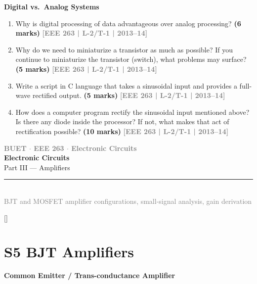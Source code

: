\documentclass[12pt,a4paper]{article}
\newcommand{\yr}[1]{\hfill\textcolor{gray}{\small\textbf{[#1]}}}
\newcommand{\mk}[1]{\textcolor{orange!70!black}{\small\textbf{(#1 marks)}}}
\newcommand{\subtopic}[2]{%
  \vspace{10pt}
  \noindent\begin{tcolorbox}[colback=#1!8,colframe=#1,boxrule=0.6pt,arc=4pt,
    left=6pt,right=6pt,top=4pt,bottom=4pt]
    \small\bfseries\textcolor{#1}{#2}
  \end{tcolorbox}
  \vspace{2pt}
}
\newcommand{\secdivider}[3]{%
  \newpage\thispagestyle{empty}%
  \vspace*{\fill}%
  \begin{tcolorbox}[enhanced,colback=#3!6,colframe=#3,boxrule=1.5pt,arc=8pt,
    left=20pt,right=20pt,top=22pt,bottom=22pt,
    shadow={3pt}{-3pt}{0pt}{black!15}]
    \centering
    {\large\textcolor{gray}{\textbf{BUET $\cdot$ EEE 263 $\cdot$ Electronic Circuits}}}\\[8pt]
    {\fontsize{26}{32}\selectfont\bfseries\textcolor{#3}{Electronic Circuits}}\\[6pt]
    {\fontsize{15}{19}\selectfont\textcolor{dgray}{#1}}\\[12pt]
    \textcolor{#3!60}{\rule{0.5\textwidth}{0.5pt}}\\[6pt]
    {\small\textcolor{gray}{#2}}
  \end{tcolorbox}%
  \vspace*{\fill}\newpage%
}
\begin{document}
\subtopic{cB}{Digital vs.\ Analog Systems}
\label{sub:s4-digital}

\begin{enumerate}

\item Why is digital processing of data advantageous over analog processing?
\mk{6} \yr{EEE 263 | L-2/T-1 | 2013--14}

\item Why do we need to miniaturize a transistor as much as possible? If you continue to miniaturize the transistor (switch), what problems may surface?
\mk{5} \yr{EEE 263 | L-2/T-1 | 2013--14}

\item Write a script in C language that takes a sinusoidal input and provides a full-wave rectified output.
\mk{5} \yr{EEE 263 | L-2/T-1 | 2013--14}

\item How does a computer program rectify the sinusoidal input mentioned above? Is there any diode inside the processor? If not, what makes that act of rectification possible?
\mk{10} \yr{EEE 263 | L-2/T-1 | 2013--14}

\end{enumerate}


\secdivider{Part III --- Amplifiers}{BJT and MOSFET amplifier configurations, small-signal analysis, gain derivation}{cC}

\label{sec:S5}
\titleformat{\section}{\large\bfseries\color{cC}}{}{0em}{}[\titlerule]
\section*{S5 \quad BJT Amplifiers}

\subtopic{cC}{Common Emitter / Trans-conductance Amplifier}
\label{sub:s5-ce}
\end{document}
